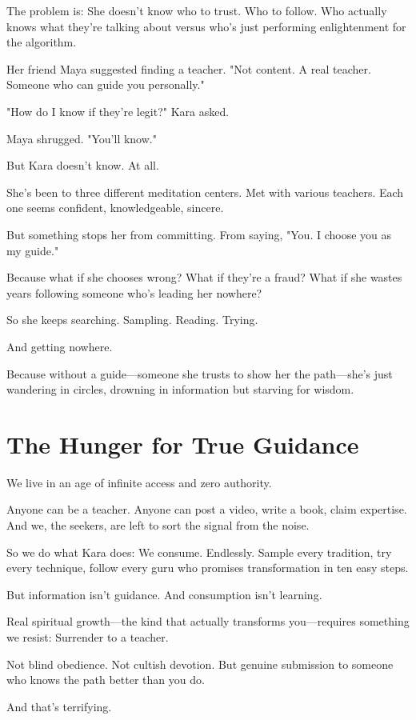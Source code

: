\documentclass[11pt,twoside]{book}
\begin{document}
The problem is: She doesn't know who to trust. Who to follow. Who actually knows what they're talking about versus who's just performing enlightenment for the algorithm.

Her friend Maya suggested finding a teacher. "Not content. A real teacher. Someone who can guide you personally."

"How do I know if they're legit?" Kara asked.

Maya shrugged. "You'll know."

But Kara doesn't know. At all.

She's been to three different meditation centers. Met with various teachers. Each one seems confident, knowledgeable, sincere.

But something stops her from committing. From saying, "You. I choose you as my guide."

Because what if she chooses wrong? What if they're a fraud? What if she wastes years following someone who's leading her nowhere?

So she keeps searching. Sampling. Reading. Trying.

And getting nowhere.

Because without a guide—someone she trusts to show her the path—she's just wandering in circles, drowning in information but starving for wisdom.

\section*{The Hunger for True Guidance}

We live in an age of infinite access and zero authority.

Anyone can be a teacher. Anyone can post a video, write a book, claim expertise. And we, the seekers, are left to sort the signal from the noise.

So we do what Kara does: We consume. Endlessly. Sample every tradition, try every technique, follow every guru who promises transformation in ten easy steps.

But information isn't guidance. And consumption isn't learning.

Real spiritual growth—the kind that actually transforms you—requires something we resist: Surrender to a teacher.

Not blind obedience. Not cultish devotion. But genuine submission to someone who knows the path better than you do.

And that's terrifying.
\end{document}
